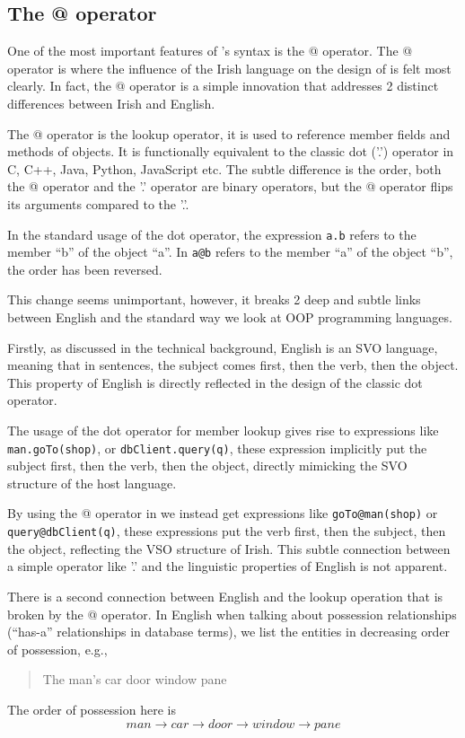 \subsection{The @ operator}\label{atoperator}

One of the most important features of \Setanta{}'s syntax is the @ operator. The @ operator is where the influence of the Irish language on the design of \Setanta{} is felt most clearly. In fact, the @ operator is a simple innovation that addresses 2 distinct differences between Irish and English.

The @ operator is the lookup operator, it is used to reference member fields and methods of objects. It is functionally equivalent to the classic dot ('.') operator in C, C++, Java, Python, JavaScript etc. The subtle difference is the order, both the @ operator and the '.' operator are binary operators, but the @ operator flips its arguments compared to the '.'.

In the standard usage of the dot operator, the expression \verb|a.b| refers to the member ``b'' of the object ``a''. In \Setanta{} \verb|a@b| refers to the member ``a'' of the object ``b'', the order has been reversed.

This change seems unimportant, however, it breaks 2 deep and subtle links between English and the standard way we look at OOP programming languages.

Firstly, as discussed in the technical background, English is an SVO language, meaning that in sentences, the subject comes first, then the verb, then the object. This property of English is directly reflected in the design of the classic dot operator.

The usage of the dot operator for member lookup gives rise to expressions like \verb|man.goTo(shop)|, or \verb|dbClient.query(q)|, these expression implicitly put the subject first, then the verb, then the object, directly mimicking the SVO structure of the host language.

By using the @ operator in \Setanta{} we instead get expressions like \verb|goTo@man(shop)| or \verb|query@dbClient(q)|, these expressions put the verb first, then the subject, then the object, reflecting the VSO structure of Irish. This subtle connection between a simple operator like '.' and the linguistic properties of English is not apparent.

There is a second connection between English and the lookup operation that is broken by the @ operator. In English when talking about possession relationships (``has-a'' relationships in database terms), we list the entities in decreasing order of possession, e.g.,
\begin{quote}
    The man's car door window pane
\end{quote}
The order of possession here is
\[man \rightarrow car \rightarrow door \rightarrow window \rightarrow pane\]

